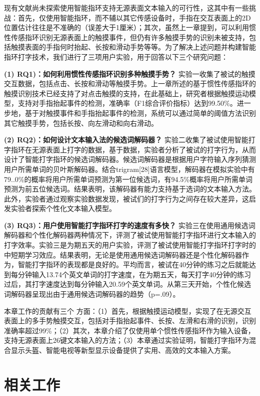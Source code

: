 现有文献尚未探索使用智能指环支持无源表面文本输入的可行性，这其中有一些挑战：首先，仅使用智能指环，而不辅以其它传感设备时，手指在交互表面上的2D位置估计往往是不准确的（误差大于1厘米）\cite{kienzle2014lightring}；其次，虽然上一章提到，可以利用惯性传感指环识别无源表面上的触摸事件，但仍有许多触摸手势的识别未被支持，包括触摸表面的手指何时抬起、长按和滑动手势等等。为了解决上述问题并构建智能指环打字技术，我们进行了三项用户实验，用于回答以下三个研究问题：

\textbf{(1) RQ1)：如何利用惯性传感指环识别多种触摸手势？}
实验一收集了被试的触摸交互数据，包括点击、长按和滑动等触摸手势。上一章所述的基于惯性传感指环的触摸识别技术已经支持了对点击触摸的支持，在此基础上，研究者根据触摸运动模型，支持对手指抬起事件的检测，准确率（F1综合评价指标）达到99.50\%。进一步地，基于对触摸事件和手指抬起事件的检测，系统可以通过简单的阈值方法识别其它触摸手势，包括长按、向左滑动和向右滑动。

\textbf{(2) RQ2)：如何设计文本输入法的候选词解码器？}
实验二收集了被试使用智能打字指环在无源表面上打字的数据，基于数据，实验者分析了被试的打字行为，从而设计了智能打字指环的候选词解码器。候选词解码器是根据用户字符输入序列猜测用户所需单词的贝叶斯解码器。结合trigram[28]语言模型，解码器在模拟实验中有79..0\%的概率将用户所需单词预测为第一位候选词，有94.5\%概率将用户所需单词预测为前五位候选词。结果表明，该解码器有能力支持基于选词的文本输入方法。此外，实验者通过观察实验数据发现，被试们的打字行为之间存在较大差异，这启发实验者探索个性化文本输入模型。

\textbf{(3) RQ3)：用户使用智能打字指环打字的速度有多快？}
实验三在使用通用候选词解码器和个性化解码器两种情况下，评测了被试使用智能打字指环进行文本输入的打字效率。实验三是为期五天的用户实验，评测了被试使用智能打字指环打字时的中短期学习效应。结果表明，无论是使用通用候选词解码器还是个性化解码器作为，智能打字指环的表现都是良好的。平均而言，被试在40分钟的练习之后就能达到每分钟输入13.74个英文单词的打字速度，在为期五天，每天打字40分钟的练习过后，其打字速度达到每分钟输入20.59个英文单词。从第三天开始，个性化候选词解码器呈现出由于通用候选词解码器的趋势（p=.09）。

本章工作的贡献有三个 方面：（1）首先，根据触摸运动模型，实现了在无源交互表面上的多手势触摸交互，包括对手指抬起事件、长按、左滑和右滑的识别，识别准确率超过99\%；（2）其次，本章介绍了仅使用单个惯性传感指环作为输入设备，支持无源表面上26键文本输入的方法；（3）本章通过实验证明，智能打字指环为混合显示头盔、智能电视等新型显示设备提供了实用、高效的文本输入方案。

\section{相关工作}

